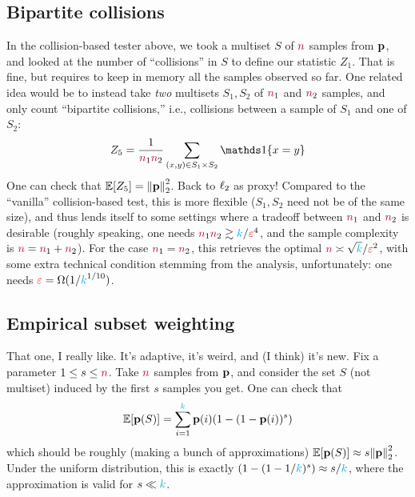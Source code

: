 \subsection{Bipartite collisions} In the collision-based tester above, we took a multiset $S$ of $\ns$ samples from $\p$, and looked at the number of ``collisions'' in $S$ to define our statistic $Z_1$. That is fine, but requires to keep in memory all the samples observed so far. One related idea would be to instead take \emph{two} multisets $S_1,S_2$ of $\ns_1$ and $\ns_2$ samples, and only count ``bipartite collisions,'' i.e., collisions between a sample of $S_1$ and one of $S_2$:
\begin{equation}
    Z_5 = \frac{1}{\ns_1 \ns_2}\sum_{(x,y)\in S_1\times S_2} \indic{x=y}
\end{equation}
One can check that $\expect{Z_5} = \normtwo{\p}^2$. Back to $\lp[2]$ as proxy! Compared to the ``vanilla'' collision-based test, this is more flexible ($S_1,S_2$ need not be of the same size), and thus lends itself to some settings where a tradeoff between $\ns_1$ and $\ns_2$ is desirable (roughly speaking, one needs $\ns_1\ns_2 \gtrsim \ab/\dst^4$, and the sample complexity is $\ns=\ns_1+\ns_2$). For the case $\ns_1=\ns_2$, this retrieves the optimal $\ns \asymp \sqrt{\ab}/\dst^2$, with some extra technical condition stemming from the analysis, unfortunately: one needs $\dst = \Omega(1/\ab^{1/10})$.

\subsection{Empirical subset weighting} That one, I really like. It's adaptive, it's weird, and (I think) it's new. Fix a parameter $1\leq s \leq \ns$. Take $\ns$ samples from $\p$, and consider the set $S$ (not multiset) induced by the first $s$ samples you get. One can check that
\begin{equation}
    \expect{\p(S)} = \sum_{i=1}^\ab \p(i) (1-(1-\p(i))^s)
\end{equation}
which should be roughly (making a bunch of approximations) $\expect{\p(S)}\approx s\normtwo{\p}^2$. Under the uniform distribution, this is exactly $(1-(1-1/\ab)^s)\approx s/\ab$, where the approximation is valid for $s\ll \ab$.

